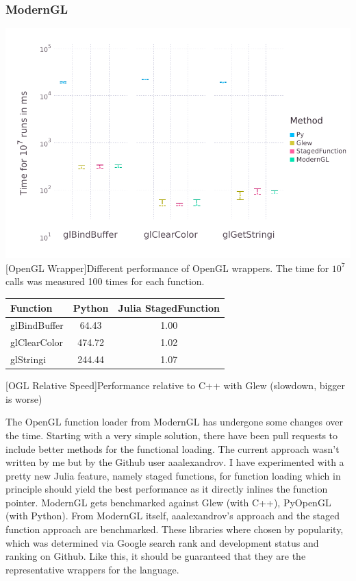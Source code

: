 \subsubsection{ModernGL}
\vspace{1em}
\begin{minipage}{\linewidth}
    \centering
    \includegraphics[width=0.9\linewidth]{graphics/glbench.pdf}
    [OpenGL Wrapper]{Different performance of OpenGL wrappers. The time for $10^7$ calls was measured 100 times for each function.}
    \label{fig:openglwrapper}
\end{minipage}
\begin{table}[htbp]
    \centering
    \begin{tabular}{l|c|c}
        \hline
        \textbf{Function}   & \textbf{Python}    & \textbf{Julia StagedFunction} \\
        \hline
        glBindBuffer        & 64.43              & 1.00\\
        glClearColor        & 474.72             & 1.02\\
        glStringi           & 244.44             & 1.07\\
    \end{tabular}
    [OGL Relative Speed]{Performance relative to C++ with Glew (slowdown, bigger is worse)}
    \label{table:relativespeedoglw}
\end{table}

The OpenGL function loader from ModernGL has undergone some changes over the time. 
Starting with a very simple solution, there have been pull requests to include better methods for the functional loading.
The current approach wasn't written by me but by the Github user aaalexandrov.
I have experimented with a pretty new Julia feature, namely staged functions, for function loading which in principle should yield the best performance as it directly inlines the function pointer.
ModernGL gets benchmarked against Glew (with C++), PyOpenGL (with Python). From ModernGL itself, aaalexandrov's approach and the staged function approach are benchmarked.
These libraries where chosen by popularity, which was determined via Google search rank and development status and ranking on Github.
Like this, it should be guaranteed that they are the representative wrappers for the language.


